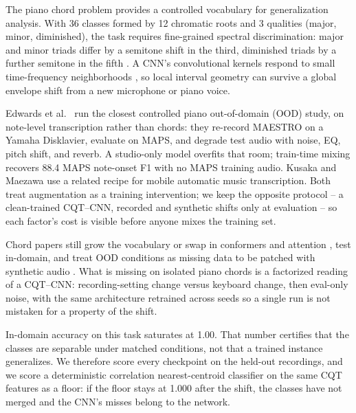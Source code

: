 \documentclass[pdflatex,sn-mathphys-num,iicol]{sn-jnl}
\theoremstyle{thmstyleone}
\theoremstyle{thmstyletwo}
\theoremstyle{thmstylethree}
\begin{document}
The piano chord problem provides a controlled vocabulary for generalization analysis. With 36 classes formed by 12 chromatic roots and 3 qualities (major, minor, diminished), the task requires fine-grained spectral discrimination: major and minor triads differ by a semitone shift in the third, diminished triads by a further semitone in the fifth \cite{Harte2010}. A CNN's convolutional kernels respond to small time-frequency neighborhoods \cite{OShea2015}\cite{Purwono2022}, so local interval geometry can survive a global envelope shift from a new microphone or piano voice.

Edwards et al.\ \cite{Edwards2024} run the closest controlled piano out-of-domain (OOD) study, on note-level transcription rather than chords: they re-record MAESTRO on a Yamaha Disklavier, evaluate on MAPS, and degrade test audio with noise, EQ, pitch shift, and reverb. A studio-only model overfits that room; train-time mixing recovers 88.4 MAPS note-onset F1 with no MAPS training audio. Kusaka and Maezawa \cite{Kusaka2024} use a related recipe for mobile automatic music transcription. Both treat augmentation as a training intervention; we keep the opposite protocol -- a clean-trained CQT--CNN, recorded and synthetic shifts only at evaluation -- so each factor's cost is visible before anyone mixes the training set.

Chord papers still grow the vocabulary \cite{Majchrzak2025} or swap in conformers \cite{Akram2025} and attention \cite{Kusaka2024}, test in-domain, and treat OOD conditions as missing data to be patched with synthetic audio \cite{Byambatsogt2020}\cite{Ostermann2023}. What is missing on isolated piano chords is a factorized reading of a CQT--CNN: recording-setting change versus keyboard change, then eval-only noise, with the same architecture retrained across seeds so a single run is not mistaken for a property of the shift.

In-domain accuracy on this task saturates at 1.00. That number certifies that the classes are separable under matched conditions, not that a trained instance generalizes. We therefore score every checkpoint on the held-out recordings, and we score a deterministic correlation nearest-centroid classifier on the same CQT features as a floor: if the floor stays at 1.000 after the shift, the classes have not merged and the CNN's misses belong to the network.
\end{document}
